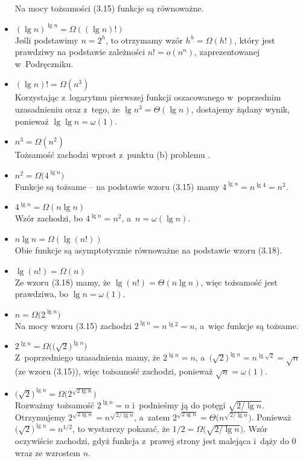 \begin{itemize}
	Na mocy tożsamości (3.15) funkcje są równoważne.
\item $(\lg n)^{\lg n}=\Omega((\lg n)!)$ \\
	Jeśli podstawimy $n=2^h$, to otrzymamy wzór $h^h=\Omega(h!)$, który jest prawdziwy na podstawie zależności $n!=o(n^n)$, zaprezentowanej w~Podręczniku.
\item $(\lg n)!=\Omega(n^3)$ \\
	Korzystając z~logarytmu pierwszej funkcji oszacowanego w~poprzednim uzasadnieniu oraz z~tego, że $\lg n^3=\Theta(\lg n)$, dostajemy żądany wynik, ponieważ $\lg\lg n=\omega(1)$.
\item $n^3=\Omega(n^2)$ \\
	Tożsamość zachodzi wprost z~punktu (b) problemu .
\item $n^2=\Omega\bigl(4^{\lg n}\bigr)$ \\
	Funkcje są tożsame -- na podstawie wzoru (3.15) mamy $4^{\lg n}=n^{\lg4}=n^2$.
\item $4^{\lg n}=\Omega(n\lg n)$ \\
	Wzór zachodzi, bo $4^{\lg n}=n^2$, a~$n=\omega(\lg n)$.
\item $n\lg n=\Omega(\lg(n!))$ \\
	Obie funkcje są asymptotycznie równoważne na podstawie wzoru (3.18).
\item $\lg(n!)=\Omega(n)$ \\
	Ze wzoru (3.18) mamy, że $\lg(n!)=\Theta(n\lg n)$, więc tożsamość jest prawdziwa, bo $\lg n=\omega(1)$.
\item $n=\Omega\bigl(2^{\lg n}\bigr)$ \\
	Na mocy wzoru (3.15) zachodzi $2^{\lg n}=n^{\lg2}=n$, a~więc funkcje są tożsame.
\item $2^{\lg n}=\Omega\bigl(\!\bigl(\!\sqrt{2}\bigr)^{\lg n}\bigr)$ \\
	Z~poprzedniego uzasadnienia mamy, że $2^{\lg n}=n$, a~$\bigl(\!\sqrt{2}\bigr)^{\lg n}=n^{\lg\sqrt{2}}=\sqrt{n}$ (ze wzoru (3.15)), więc tożsamość zachodzi, ponieważ $\sqrt{n}=\omega(1)$.
\item $\bigl(\!\sqrt{2}\bigr)^{\lg n}=\Omega\bigl(2^{\sqrt{2\lg n}}\bigr)$ \\
	Rozważmy tożsamość $2^{\lg n}=n$ i~podnieśmy ją do potęgi $\sqrt{2/\!\lg n}$.
Otrzymujemy $2^{\sqrt{2\lg n}}=n^{\sqrt{2/\!\lg n}}$, a~zatem $2^{\sqrt{2\lg n}}=\Theta\bigl(n^{\sqrt{2/\!\lg n}}\bigr)$.
Ponieważ $\bigl(\!\sqrt{2}\bigr)^{\lg n}=n^{1/2}$, to wystarczy pokazać, że $1/2=\Omega\bigl(\!\sqrt{2/\!\lg n}\bigr)$.
Wzór oczywiście zachodzi, gdyż funkcja z~prawej strony jest malejąca i~dąży do 0 wraz ze wzrostem $n$.

\end{itemize}

